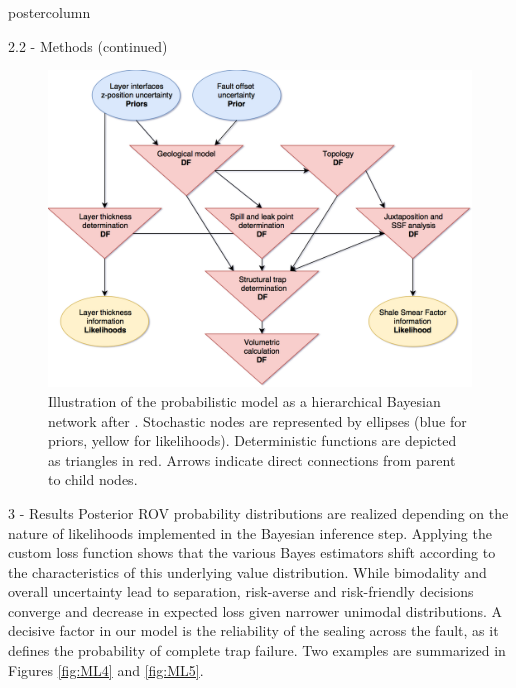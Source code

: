 \documentclass{beamer}
\begin{document}
\begin{frame}
\begin{columns}
\begin{column}{.499\textwidth}
\begin{beamercolorbox}[center]{postercolumn}
\begin{minipage}{.98\textwidth}
{\begin{myblock}{2.2 - Methods (continued)}
\begin{minipage}{0.327\textwidth}
\begin{figure}
									\label{fig:trap_cond}
								\end{figure}
								\end{minipage}
								\begin{minipage}{0.327\textwidth}
								\begin{figure}
									\centering
									\includegraphics[width=1\textwidth]{figures/model_network}
									\caption{Illustration of the probabilistic model as a hierarchical Bayesian network after \citet{koller2009probabilistic}. Stochastic nodes are represented by ellipses (blue for
									priors, yellow for likelihoods). Deterministic functions are depicted as triangles in
									red. Arrows indicate direct connections from parent to child nodes.}
									\label{fig:model_network}
								\end{figure}
								\end{minipage}
\end{myblock}
								
\begin{myblock}{3 - Results}
Posterior ROV probability distributions are realized depending on the nature of likelihoods implemented in the Bayesian inference step. Applying the custom loss function shows that the various Bayes estimators shift according to the characteristics of this underlying	value distribution. While bimodality and overall uncertainty lead to separation, risk-averse and risk-friendly decisions converge and decrease in expected loss given narrower unimodal distributions. A decisive factor in our model is the reliability of the sealing across the fault, as it defines the probability of complete trap failure. Two examples are summarized in Figures \ref{fig:ML4} and \ref{fig:ML5}.
				

\end{myblock}}
\end{minipage}
\end{beamercolorbox}
\end{column}
\end{columns}
\end{frame}
\end{document}

